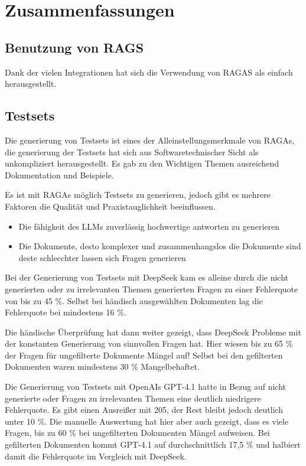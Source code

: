 \chapter{Zusammenfassungen}

\section{Benutzung von RAGS}
Dank der vielen Integrationen hat sich die Verwendung von RAGAS als einfach herausgestellt.

\section{Testsets}
Die generierung von Testsets ist eines der Alleinstellungsmerkmale von RAGAs, die generierung der Testsets hat sich aus Softwaretechnischer Sicht als unkompliziert herausgestellt.
Es gab zu den Wichtigen Themen ausreichend Dokumentation und Beispiele.

Es ist mit RAGAs möglich Testsets zu generieren, jedoch gibt es mehrere Faktoren die Qualität und Praxistauglichkeit beeinflussen.
\begin{itemize}
    \item Die fähigkeit des LLMs zuverlässig hochwertige antworten zu generieren
    \item Die Dokumente, desto komplexer und zusammenhangslos die Dokumente sind deste schlecchter lassen sich Fragen generieren
\end{itemize}

Bei der Generierung von Testsets mit DeepSeek kam es alleine durch die nicht generierten oder zu irrelevanten Themen generierten Fragen zu einer Fehlerquote von bis zu 45 \%.
Selbst bei händisch ausgewählten Dokumenten lag die Fehlerquote bei mindestens 16 \%.

Die händische Überprüfung hat dann weiter gezeigt, dass DeepSeek Probleme mit der konstanten Generierung von sinnvollen Fragen hat.
Hier wiesen bis zu 65 \% der Fragen für ungefilterte Dokumente Mängel auf! Selbst bei den gefilterten Dokumenten waren mindestens 30 \% Mangelbehaftet.

Die Generierung von Testsets mit OpenAIs GPT-4.1 hatte in Bezug auf nicht generierte oder Fragen zu irrelevanten Themen eine deutlich niedrigere Fehlerquote.
Es gibt einen Ausreißer mit 205, der Rest bleibt jedoch deutlich unter 10 \%.
Die manuelle Auswertung hat hier aber auch gezeigt, dass es viele Fragen, bis zu 60 \% bei ungefilterten Dokumenten Mängel aufweisen.
Bei gefilterten Dokumenten kommt GPT-4.1 auf durchschnittlich 17,5 \% und halbiert damit die Fehlerquote im Vergleich mit DeepSeek. 

